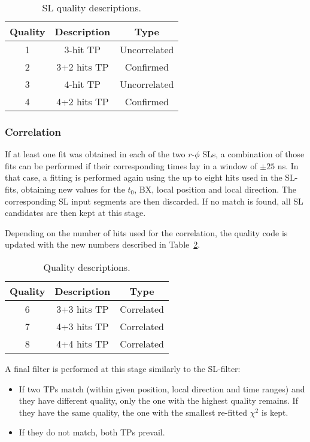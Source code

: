 \documentclass[../main.tex]{subfiles}
\begin{document}
\begin{table}[h!]
	\centering
	\begin{tabular}{c|c|c}
		Quality & Description & Type \\\hline
		1 & 3-hit TP & Uncorrelated \\
		2 & 3+2 hits TP & Confirmed \\
		3 & 4-hit TP & Uncorrelated \\
		4 & 4+2 hits TP & Confirmed
	\end{tabular}
	\caption{SL quality descriptions.}
	\label{dts:tab:quality_sl}
\end{table}


\subsubsection*{Correlation}

If at least one fit was obtained in each of the two $r$-$\phi$ SLs, a combination of those fits can be performed if their corresponding times lay in a window of $\pm 25$ ns. In that case, a fitting is performed again using the up to eight hits used in the SL-fits, obtaining new values for the $t_0$, BX, local position and local direction. The corresponding SL input segments are then discarded. If no match is found, all SL candidates are then kept at this stage. 

Depending on the number of hits used for the correlation, the quality code is updated with the new numbers described in Table~\ref{dts:tab:quality_cor}.


\begin{table}[h!]
	\centering
	\begin{tabular}{c|c|c}
		Quality & Description & Type \\\hline
		6 & 3+3 hits TP & Correlated \\
		7 & 4+3 hits TP & Correlated \\
		8 & 4+4 hits TP & Correlated
	\end{tabular}
	\caption{Quality descriptions.}
	\label{dts:tab:quality_cor}
\end{table}

A final filter is performed at this stage similarly to the SL-filter:
\begin{itemize}
\item If two TPs match (within given position, local direction and time ranges) and they have different quality, only the one with the highest quality remains. If they have the same quality, the one with the smallest re-fitted $\chi^2$ is kept.
\item If they do not match, both TPs prevail.
\end{itemize}
\end{document}

